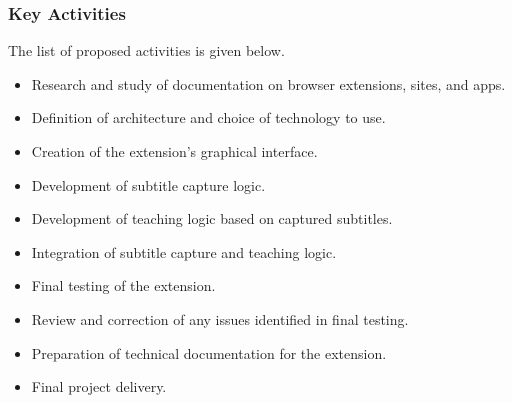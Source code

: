 \documentclass[12pt]{article}
\begin{document}
\subsubsection{Key Activities}

The list of proposed activities is given below.

\begin{itemize}
\item Research and study of documentation on browser extensions, sites, and apps.
\item Definition of architecture and choice of technology to use.
\item Creation of the extension's graphical interface.
\item Development of subtitle capture logic.
\item Development of teaching logic based on captured subtitles.
\item Integration of subtitle capture and teaching logic.
\item Final testing of the extension.
\item Review and correction of any issues identified in final testing.
\item Preparation of technical documentation for the extension.
\item Final project delivery.
\end{itemize}

 
\end{document}
